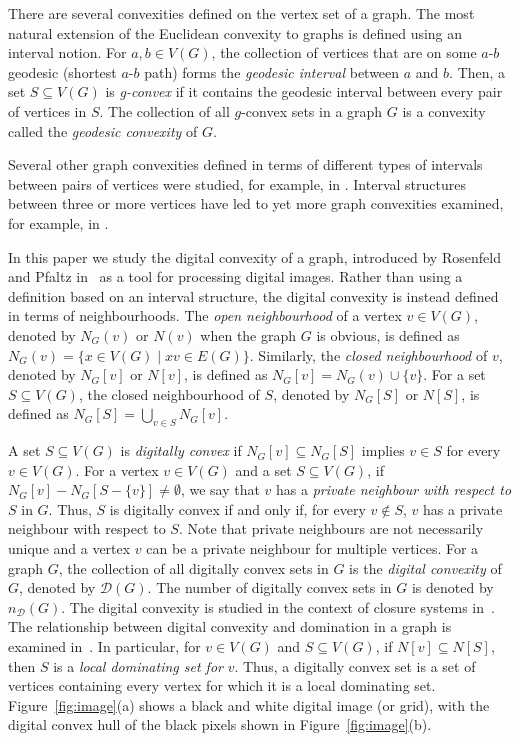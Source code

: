 \documentclass[12pt]{article}
\begin{document}
There are several convexities defined on the vertex set of a graph. The most natural extension of the Euclidean convexity to graphs is defined using an interval notion. For $a,b\in V(G)$, the collection of vertices that are on some $a$-$b$ geodesic (shortest $a$-$b$ path) forms the \emph{geodesic interval} between $a$ and $b$. Then, a set $S\subseteq V(G)$ is \emph{g-convex} if it contains the geodesic interval between every pair of vertices in $S$. The collection of all $g$-convex sets in a graph $G$ is a convexity called the \emph{geodesic convexity} of $G$. 

Several other graph convexities defined in terms of different types of intervals between pairs of vertices were studied, for example, in \cite{triangle,hhd,hyper}. Interval structures between three or more vertices have led to yet more graph convexities examined, for example, in \cite{3steinsimp, mintree, steiner}. 

In this paper we study the digital convexity of a graph, introduced by Rosenfeld and Pfaltz in~\cite{seq} as a tool for processing digital images. Rather than using a definition based on an interval structure, the digital convexity is instead defined in terms of neighbourhoods. The \emph{open neighbourhood} of a vertex $v\in V(G)$, denoted by $N_G(v)$ or $N(v)$ when the graph $G$ is obvious, is defined as $N_G(v)=\{x\in V(G)\mid xv\in E(G)\}$. Similarly, the \emph{closed neighbourhood} of $v$, denoted by $N_G[v]$ or $N[v]$, is defined as $N_G[v]=N_G(v)\cup\{v\}$. For a set $S\subseteq V(G)$, the closed neighbourhood of $S$, denoted by $N_G[S]$ or $N[S]$, is defined as $N_G[S]=\bigcup_{v\in S}N_G[v]$. 

A set $S\subseteq V(G)$ is \emph{digitally convex} if $N_G[v]\subseteq N_G[S]$ implies $v\in S$ for every $v\in V(G)$. For a vertex $v\in V(G)$ and a set $S\subseteq V(G)$, if $N_G[v]-N_G[S-\{v\}]\neq \emptyset$, we say that $v$ has a \emph{private neighbour with respect to} $S$ in $G$. Thus, $S$ is digitally convex if and only if, for every $v\not\in S$, $v$ has a private neighbour with respect to $S$. Note that private neighbours are not necessarily unique and a vertex $v$ can be a private neighbour for multiple vertices. For a graph $G$, the collection of all digitally convex sets in $G$ is the \emph{digital convexity} of $G$, denoted by $\mathscr{D}(G)$. The number of digitally convex sets in $G$ is denoted by $n_\mathscr{D}(G)$. The digital convexity is studied in the context of closure systems in~\cite{closure}. The relationship between digital convexity and domination in a graph is examined in~\cite{frame,digconv}. In particular, for $v\in V(G)$ and $S\subseteq V(G)$, if $N[v]\subseteq N[S]$, then $S$ is a \emph{local dominating set for} $v$. Thus, a digitally convex set is a set of vertices containing every vertex for which it is a local dominating set. Figure~\ref{fig:image}(a) shows a black and white digital image (or grid), with the digital convex hull of the black pixels shown in Figure~\ref{fig:image}(b). 
\end{document}
